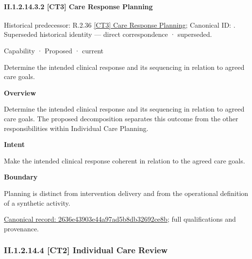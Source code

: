\paragraph*{II.1.2.14.3.2 [CT3] Care Response Planning}
\label{navigation:II.1.2.14.3.2}

{\small Historical predecessor: R.2.36 \hyperref[element:d64569acaf2c44f3b2a5332f74fff7c7]{[CT3] Care Response Planning}; Canonical ID: \texttt{}. Superseded historical identity — direct correspondence · superseded.}\par
\label{element:2636e43903e44a97ad5b8db32692ce8b}
{\small Capability · Proposed · current}\par

Determine the intended clinical response and its sequencing in relation to agreed care goals.



\textbf{Overview}



Determine the intended clinical response and its sequencing in relation to agreed care goals. The proposed decomposition separates this outcome from the other responsibilities within Individual Care Planning.



\textbf{Intent}



Make the intended clinical response coherent in relation to the agreed care goals.



\textbf{Boundary}



Planning is distinct from intervention delivery and from the operational definition of a synthetic activity.


{\footnotesize \href{../../../../../../../continuum/strategy/capability/2636e43903e44a97ad5b8db32692ce8b.md}{Canonical record: 2636e43903e44a97ad5b8db32692ce8b}; full qualifications and provenance.}\par
\subsubsection*{II.1.2.14.4 [CT2] Individual Care Review}
\label{navigation:II.1.2.14.4}

